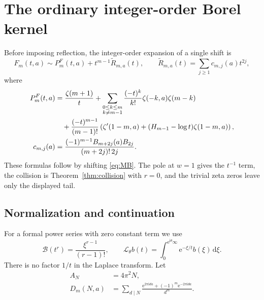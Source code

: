 \documentclass[11pt,a4paper]{article}
\numberwithin{equation}{section}
\theoremstyle{definition}\newtheorem{definition}[theorem]{Definition}
\theoremstyle{remark}\newtheorem{remark}[theorem]{Remark}
\newcommand{\ii}{\mathrm i}\newcommand{\e}{\mathrm e}
\newcommand{\dd}{\,\mathrm d}\newcommand{\Li}{\operatorname{Li}}
\newcommand{\B}{\mathcal B}\newcommand{\Sp}{\mathcal S_+}
\begin{document}
\section{The ordinary integer-order Borel kernel}
\label{sec:base-borel}

Before imposing reflection, the integer-order expansion of a single
shift is
\begin{equation}
 F_m(t,a)\sim P_m^F(t,a)+t^{m-1}\widetilde R_{m,a}(t),
 \qquad\widetilde R_{m,a}(t)=\sum_{j\ge1}c_{m,j}(a)t^{2j},
 \label{eq:F-expansion}
\end{equation}
where
\begin{align}
 P_m^F(t,a)&=\frac{\zeta(m+1)}t+
 \sum_{\substack{0\le k\le m\\k\ne m-1}}
       \frac{(-t)^k}{k!}\zeta(-k,a)\zeta(m-k)\notag\\
 &\quad+\frac{(-t)^{m-1}}{(m-1)!}
 \left(\zeta'(1-m,a)
       +(H_{m-1}-\log t)\zeta(1-m,a)\right),\label{eq:PF}\\
 c_{m,j}(a)&=\frac{(-1)^{m-1}B_{m+2j}(a)B_{2j}}
                         {(m+2j)!\,2j}.
                         \label{eq:c-coeff}
\end{align}
These formulas follow by shifting \eqref{eq:MB}. The pole at $w=1$
gives the $t^{-1}$ term, the collision is Theorem~\ref{thm:collision}
with $r=0$, and the trivial zeta zeros leave only the displayed tail.

\subsection{Normalization and continuation}
For a formal power series with zero constant term we use
\begin{equation}
 \B(t^r)=\frac{\xi^{r-1}}{(r-1)!},\qquad
 \mathcal L_\theta b(t)=\int_0^{\e^{\ii\theta}\infty}
                                      \e^{-\xi/t}b(\xi)\dd\xi.
 \label{eq:Borel-normalization}
\end{equation}
There is no factor $1/t$ in the Laplace transform. Let
\begin{align}
 A_N&=4\pi^2N,\label{eq:actions}\\
 D_m(N,a)&=\sum_{d\mid N}
       \frac{\e^{2\pi\ii da}+(-1)^m\e^{-2\pi\ii da}}{d^m}.
       \label{eq:D}
\end{align}
\end{document}
